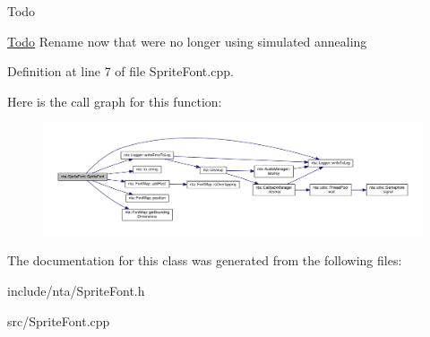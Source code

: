 \begin{DoxyRefDesc}{Todo}
\item[\hyperlink{todo__todo000010}{Todo}]Rename now that we\textquotesingle{}re no longer using simulated annealing \end{DoxyRefDesc}


Definition at line 7 of file Sprite\+Font.\+cpp.

Here is the call graph for this function\+:
\nopagebreak
\begin{figure}[H]
\begin{center}
\leavevmode
\includegraphics[width=350pt]{d6/d57/classnta_1_1SpriteFont_a9dc96f31efd0830dcb476ea87534e358_cgraph}
\end{center}
\end{figure}


The documentation for this class was generated from the following files\+:\begin{DoxyCompactItemize}
\item 
include/nta/Sprite\+Font.\+h\item 
src/Sprite\+Font.\+cpp\end{DoxyCompactItemize}
